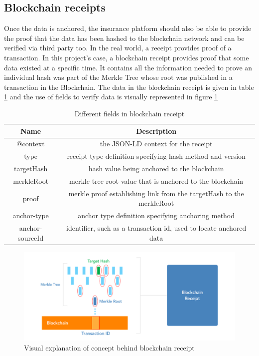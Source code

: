 \subsection{Blockchain receipts}
Once the data is anchored, the insurance platform should also be able to provide the proof that the data has been hashed to the blockchain network and can be verified via third party too. In the real world, a receipt provides proof of a transaction. In this project's case, a blockchain receipt provides proof that some data existed at a specific time. It contains all the information needed to prove an individual hash was part of the Merkle Tree whose root was published in a transaction in the Blockchain. The data in the blockchain receipt is given in table \ref{table:receipt} and the use of fields to verify data is visually represented in figure \ref{fig:merkle}
\begin{table}[h!]
\centering
\begin{tabular}{||c c||} 
\hline
Name & Description  \\ [0.5ex] 
\hline\hline
@context & the JSON-LD context for the receipt \\ 
\hline
type & receipt type definition specifying hash method and version \\
\hline
targetHash & hash value being anchored to the blockchain \\
\hline
merkleRoot	& merkle tree root value that is anchored to the blockchain \\
\hline
proof	& merkle proof establishing link from the targetHash to the merkleRoot \\
\hline
anchor-type	& anchor type definition specifying anchoring method \\
\hline
anchor-sourceId &	identifier, such as a transaction id, used to locate anchored data \\ [1ex]
 \hline
\end{tabular}
\caption{Different fields in blockchain receipt}
\label{table:receipt}
\end{table}

\begin{figure}[ht]
    \centering
    \includegraphics[width=\textwidth]{Figures/Merkle.png}
    \caption{Visual explanation of concept behind blockchain receipt\cite{Wayne2016Chainpoint:Receipts}}
    \label{fig:merkle}
\end{figure}

